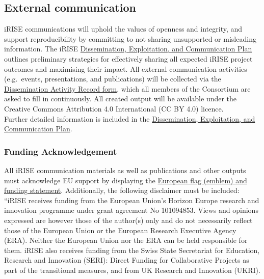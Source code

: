 \documentclass[
]{article}
\begin{document}
\hypertarget{external-communication}{%
\subsection{External communication}\label{external-communication}}

iRISE communications will uphold the values of openness and integrity, and support reproducibility by committing to not sharing unsupported or misleading information. The iRISE \href{https://charitede.sharepoint.com/:w:/r/sites/iRISE/Shared\%20Documents/WP6/iRISE\%20Dissemination\%20Plan_Draft\%201.2.docx?d=w7a63d0ea4a374c1bbe3b7fd98d0c7d2f\&csf=1\&web=1\&e=jY54DT}{Dissemination, Exploitation, and Communication Plan} outlines preliminary strategies for effectively sharing all expected iRISE project outcomes and maximising their impact. All external communication activities (e.g.~events, presentations, and publications) will be collected via the \href{https://charitede.sharepoint.com/:x:/r/sites/iRISE/Shared\%20Documents/WP6/iRISE\%20Dissemination\%20Activity\%20Record.xlsx?d=w47a1cbfaa6c34ab5aee84a6dba643912\&csf=1\&web=1\&e=85BMn0}{Dissemination Activity Record form}, which all members of the Consortium are asked to fill in continuously. All created output will be available under the Creative Commons Attribution 4.0 International (CC BY 4.0) licence.\\
Further detailed information is included in the \href{https://charitede.sharepoint.com/:w:/r/sites/iRISE/Shared\%20Documents/WP6/iRISE\%20Dissemination\%20Plan_Draft\%201.2.docx?d=w7a63d0ea4a374c1bbe3b7fd98d0c7d2f\&csf=1\&web=1\&e=jY54DT}{Dissemination, Exploitation, and Communication Plan}.

\hypertarget{funding-acknowledgement}{%
\subsubsection{Funding Acknowledgement}\label{funding-acknowledgement}}

All iRISE communication materials as well as publications and other outputs must acknowledge EU support by displaying the \href{https://webgate.ec.europa.eu/funding-tenders-opportunities/pages/viewpage.action?pageId=1867972}{European flag (emblem) and funding statement}. Additionally, the following disclaimer must be included:\\
``iRISE receives funding from the European Union's Horizon Europe research and innovation programme under grant agreement No 101094853. Views and opinions expressed are however those of the author(s) only and do not necessarily reflect those of the European Union or the European Research Executive Agency (ERA). Neither the European Union nor the ERA can be held responsible for them. iRISE also receives funding from the Swiss State Secretariat for Education, Research and Innovation (SERI): Direct Funding for Collaborative Projects as part of the transitional measures, and from UK Research and Innovation (UKRI).
\end{document}
